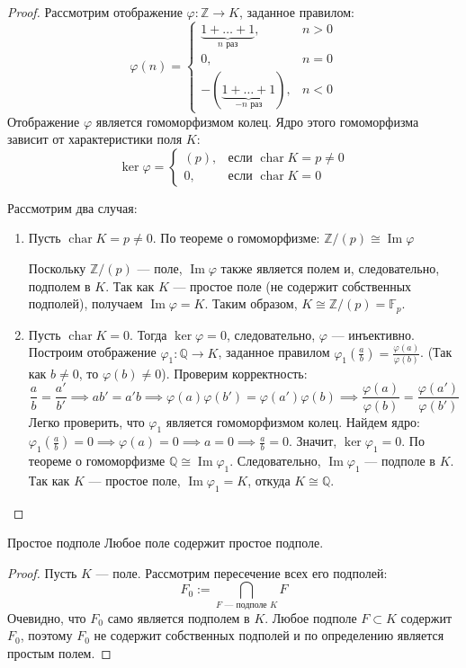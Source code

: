 \begin{proof}
	Рассмотрим отображение $\varphi\colon \mathbb{Z} \to K$, заданное правилом:
	\[
	\varphi(n) =
	\begin{cases}
		\underbrace{1 + \dots + 1}_{n \text{ раз}}, & n > 0 \\
		0, & n = 0 \\
		-(\underbrace{1 + \dots + 1}_{-n \text{ раз}}), & n < 0
	\end{cases}
	\]
	Отображение $\varphi$ является гомоморфизмом колец. Ядро этого гомоморфизма зависит от характеристики поля $K$:
	\[
	\ker\varphi =
	\begin{cases}
		(p), & \text{если } \operatorname{char} K = p \neq 0 \\
		0, & \text{если } \operatorname{char} K = 0
	\end{cases}
	\]

	Рассмотрим два случая:
	\begin{enumerate}
		\item Пусть $\operatorname{char} K = p \neq 0$. По теореме о гомоморфизме: $\mathbb{Z}/(p) \cong \operatorname{Im}\varphi $
		
		Поскольку $\mathbb{Z}/(p)$ --- поле, $\operatorname{Im}\varphi$ также является полем и, следовательно, подполем в $K$. Так как $K$ --- простое поле (не содержит собственных подполей), получаем $\operatorname{Im}\varphi = K$.
		Таким образом, $K \cong \mathbb{Z}/(p) = \mathbb{F}_p$.

		\item Пусть $\operatorname{char} K = 0$. Тогда $\ker\varphi = 0$, следовательно, $\varphi$ --- инъективно.
		Построим отображение $\varphi_1\colon \mathbb{Q} \to K$, заданное правилом $\varphi_1\left(\frac{a}{b}\right) = \frac{\varphi(a)}{\varphi(b)}$. (Так как $b \neq 0$, то $\varphi(b) \neq 0$).
		Проверим корректность:
		\[ \frac{a}{b} = \frac{a'}{b'} \implies ab' = a'b \implies \varphi(a)\varphi(b') = \varphi(a')\varphi(b) \implies \frac{\varphi(a)}{\varphi(b)} = \frac{\varphi(a')}{\varphi(b')} \]
		Легко проверить, что $\varphi_1$ является гомоморфизмом колец.
		Найдем ядро: $\varphi_1\left(\frac{a}{b}\right) = 0 \implies \varphi(a) = 0 \implies a = 0 \implies \frac{a}{b} = 0$. Значит, $\ker\varphi_1 = 0$.
		По теореме о гомоморфизме $\mathbb{Q} \cong \operatorname{Im}\varphi_1$.
		Следовательно, $\operatorname{Im}\varphi_1$ --- подполе в $K$. Так как $K$ --- простое поле, $\operatorname{Im}\varphi_1 = K$, откуда $K \cong \mathbb{Q}$.
	\end{enumerate}
\end{proof}

\begin{Proposition}{Простое подполе}{}
	Любое поле содержит простое подполе.
\end{Proposition}

\begin{proof}
	Пусть $K$ --- поле. Рассмотрим пересечение всех его подполей:
	\[ F_0 := \bigcap_{F \text{ --- подполе } K} F \]
	Очевидно, что $F_0$ само является подполем в $K$. Любое подполе $F \subset K$ содержит $F_0$, поэтому $F_0$ не содержит собственных подполей и по определению является простым полем.
\end{proof}
